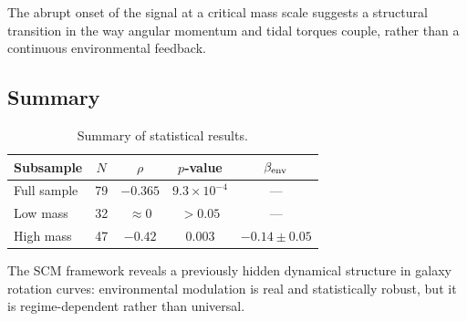 The abrupt onset of the signal at a critical mass scale suggests a structural
transition in the way angular momentum and tidal torques couple, rather than a
continuous environmental feedback.

\subsection{Summary}
\label{sec:results:summary}

\begin{table}
  \centering
  \caption{Summary of statistical results.}
  \label{tab:results}
  \begin{tabular}{lcccc}
    \hline
    Subsample & $N$ & $\rho$ & $p$-value & $\beta_{\rm env}$ \\
    \hline
    Full sample   & 79 & $-0.365$ & $9.3\times10^{-4}$ & --- \\
    Low mass      & 32 & $\approx 0$ & $> 0.05$ & --- \\
    High mass     & 47 & $-0.42$  & $0.003$            & $-0.14\pm0.05$ \\
    \hline
  \end{tabular}
\end{table}

The SCM framework reveals a previously hidden dynamical structure in galaxy
rotation curves: environmental modulation is real and statistically robust, but
it is regime-dependent rather than universal.

